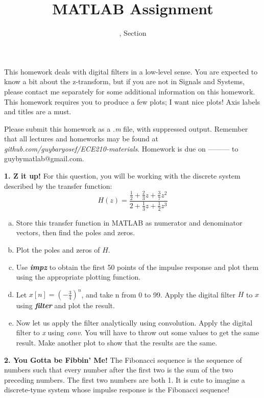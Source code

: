 \documentclass[11pt]{article}
\title{MATLAB Assignment \Homework}
\author{\Session, Section \Section}
\date{}
\makeatletter
\def\MyEmail{guybymatlab@gmail.com}
\def\DateOfSubmission{ --------- }
\makeatother
\begin{document}
\maketitle
This homework deals with digital filters in a low-level sense.
You are expected to know a bit about the z-transform,
but if you are not in Signals and Systems,
please contact me separately for some additional information on this homework.
This homework requires you to produce a few plots; I want nice plots!
Axis labels and titles are a must.

Please submit this homework as a \textit{.m} file, 
with suppressed output.
Remember that all lectures and homeworks may be found at 
\textit{github.com/guybaryosef/ECE210-materials}.
Homework is due on \DateOfSubmission to \MyEmail.

\noindent
\newline
\textbf{1. Z it up!}
For this question,
you will be working with the discrete system described by the transfer function: 
$$H(z) = \frac{\frac{1}{2}+\frac{2}{3}z+\frac{3}{7}z^2}{2+\frac{1}{3}z+\frac{1}{2}z^3}$$
\begin{enumerate}[a.]
    \item Store this transfer function in MATLAB as numerator and denominator vectors,
    then find the poles and zeros.
    
    \item Plot the poles and zeros of $H$.

    \item Use \textit{\textbf{impz}} to obtain the first 50 points of the impulse response
    and plot them using the appropriate plotting function. 
    
    \item Let $x[n] = (-\frac{3}{4})^n$, and take n from 0 to 99.
    Apply the digital filter $H$ to $x$ using \textit{\textbf{filter}} and plot the result. 
    
    \item Now let us apply the filter analytically using convolution.
    Apply the digital filter to \textit{x} using \textit{conv}.
    You will have to throw out some values to get the same result.
    Make another plot to show that the results are the same.

\end{enumerate}

\noindent
\newline
\textbf{2. You Gotta be Fibbin' Me!}
The Fibonacci sequence is the sequence of numbers such that every number after the first two
is the sum of the two preceding numbers. The first two numbers are both 1.
It is cute to imagine a discrete-tyme system whose impulse response is the Fibonacci sequence!
\end{document}
